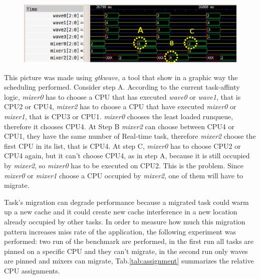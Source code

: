 \begin{figure}[h]
\centering
\includegraphics[width=\widefigure]{images/migr_i7.eps}
\caption{}
\label{fig:migr_pat}
\end{figure}

This picture was made using \textit{gtkwave}, a tool that show in a graphic way the scheduling performed.
Consider step A. According to the current task-affinty logic, \textit{mixer0}
has to choose a CPU that has executed \textit{wave0} or 
\textit{wave1}, that is CPU2 or CPU4, \textit{mixer2} has to choose a CPU that have executed \textit{mixer0} or \textit{mixer1}, that is CPU3 or 
CPU1. \textit{mixer0} chooses the least loaded runqueue, therefore it chooses CPU4. At Step B \textit{mixer2} can choose between CPU4 or CPU1, they 
have the same number of Real-time task, therefore \textit{mixer2} choose the
first CPU in its list, that is CPU4. At step C, \textit{mixer0} has to 
choose CPU2 or CPU4 again, but it can't choose CPU4, as in step A, because it is still occupied by \textit{mixer2}, so \textit{mixer0} has to be 
executed on CPU2. This is the problem. Since \textit{mixer0} or \textit{mixer1}
choose a CPU occupied by \textit{mixer2}, one of them will have to migrate.

Task's migration can degrade performance because a migrated task could warm up a new cache and it could create new cache interference in a new 
location already occupied by other tasks. In order to measure how much this migration pattern increases miss rate of the application, the following 
experiment was performed: two run of the benchmark are performed, in the first
run all tasks are pinned on a specific CPU and they can't migrate, in 
the second run only waves are pinned and mixers can migrate,
Tab.\ref{tab:assignment} summarizes the relative CPU assignments. 

